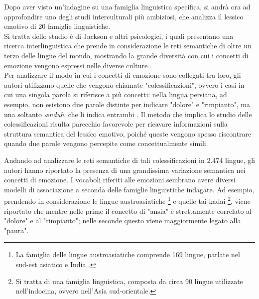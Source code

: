 Dopo aver visto un'indagine su una famiglia linguistica specifica, si andrà ora ad approfondire uno degli studi interculturali più ambiziosi, che analizza il lessico emotivo di 20 famiglie linguistiche.\\
Si tratta dello studio è di Jackson e altri psicologici, i quali presentano una ricerca interlinguistica che prende in considerazione le reti semantiche di oltre un terzo delle lingue del mondo, mostrando la grande diversità con cui i concetti di emozione vengono espressi nelle diverse culture \parencite{majid_jackson}.\\
Per analizzare il modo in cui i concetti di emozione sono collegati tra loro, gli autori utilizzano quelle che vengono chiamate "colessificazioni", ovvero i casi in cui una singola parola si riferisce a più concetti: nella lingua persiana, ad esempio, non esistono due parole distinte per indicare "dolore" e "rimpianto", ma una soltanto \textit{ænduh}, che li indica entrambi \parencite{jackson_joshua}. Il metodo che implica lo studio delle colessificazioni risulta parecchio favorevole per ricavare informazioni sulla struttura semantica del lessico emotivo, poiché queste vengono spesso riscontrare quando due parole vengono percepite come concettualmente simili. 

Andando ad analizzare le reti semantiche di tali colessificazioni in 2.474 lingue, gli autori hanno riportato la presenza di una grandissima variazione semantica nei concetti di emozione. I vocaboli riferiti alle emozioni sembrano avere diversi modelli di associazione a seconda delle famiglie linguistiche indagate. Ad esempio, prendendo in considerazione le lingue austroasiatiche \footnote{La famiglia delle lingue austroasiatiche comprende 169 lingue, parlate nel sud-est asiatico e India \parencite{austroasiatiche}.} e quelle tai-kadai \footnote{Si tratta di una famiglia linguistica, composta da circa 90 lingue utilizzate nell'indocina, ovvero nell'Asia sud-orientale.}, viene riportato che mentre nelle prime il concetto di "ansia" è strettamente correlato al "dolore" e al "rimpianto"; nelle seconde questo viene maggiormente legato alla "paura". 

